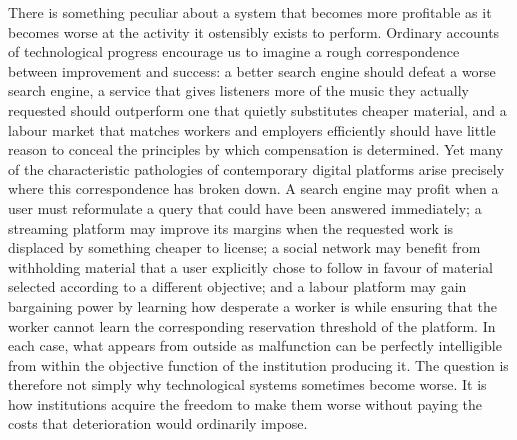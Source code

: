 \documentclass[11pt]{article}
\begin{document}
There is something peculiar about a system that becomes more profitable as it becomes worse at the activity it ostensibly exists to perform. Ordinary accounts of technological progress encourage us to imagine a rough correspondence between improvement and success: a better search engine should defeat a worse search engine, a service that gives listeners more of the music they actually requested should outperform one that quietly substitutes cheaper material, and a labour market that matches workers and employers efficiently should have little reason to conceal the principles by which compensation is determined. Yet many of the characteristic pathologies of contemporary digital platforms arise precisely where this correspondence has broken down. A search engine may profit when a user must reformulate a query that could have been answered immediately; a streaming platform may improve its margins when the requested work is displaced by something cheaper to license; a social network may benefit from withholding material that a user explicitly chose to follow in favour of material selected according to a different objective; and a labour platform may gain bargaining power by learning how desperate a worker is while ensuring that the worker cannot learn the corresponding reservation threshold of the platform. In each case, what appears from outside as malfunction can be perfectly intelligible from within the objective function of the institution producing it. The question is therefore not simply why technological systems sometimes become worse. It is how institutions acquire the freedom to make them worse without paying the costs that deterioration would ordinarily impose.
\end{document}
